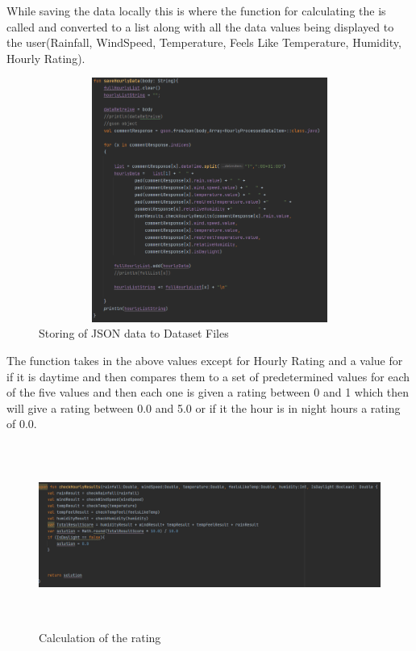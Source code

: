 While saving the data locally this is where the function for calculating the is called and converted to a list along with all the data values being displayed to the user(Rainfall, WindSpeed, Temperature, Feels Like Temperature, Humidity, Hourly Rating).

\begin{figure}[H]
    \centering
    \includegraphics[width=12cm,height = 8cm]{img/DataStore.PNG}
    \caption{Storing of JSON data to Dataset Files}
    \label{fig:altas config}
\end{figure}

The function takes in the above values except for Hourly Rating and a value for if it is daytime and then compares them to a set of predetermined values for each of the five values and then each one is given a rating between 0 and 1 which then will give a rating between 0.0 and 5.0 or if it the hour is in night hours a rating of 0.0.

\begin{figure}[H]
    \centering
    \includegraphics[width=16cm,height = 6cm]{img/DataComparison.PNG}
    \caption{Calculation of the rating}
    \label{fig:altas config}
\end{figure}

